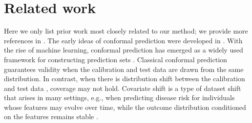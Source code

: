 \section{Related work}
Here we only list prior work most closely related to our method; we provide more references in .
The early ideas of conformal prediction were developed in \citet{saunders1999transduction,vovk1999machine}.
With the rise of machine learning, conformal prediction has emerged as a widely used framework for constructing prediction sets \citep[e.g.,][]{papadopoulos2002inductive,vovk2005algorithmic,Vovk2013}.
Classical conformal prediction guarantees validity when the calibration and test data are drawn from the same distribution. In contrast, when there is distribution shift between the calibration and test data \citep[e.g.,][]{quinonero2009dataset, shimodaira2000improving, Sugiyama2012, ben2010theory, taori2020measuring}, coverage may not hold.
Covariate shift is a type of dataset shift that arises in many settings, e.g., when predicting disease risk for individuals whose features may evolve over time, while the outcome distribution conditioned on the features remains stable \citep{quinonero2009dataset}. 

